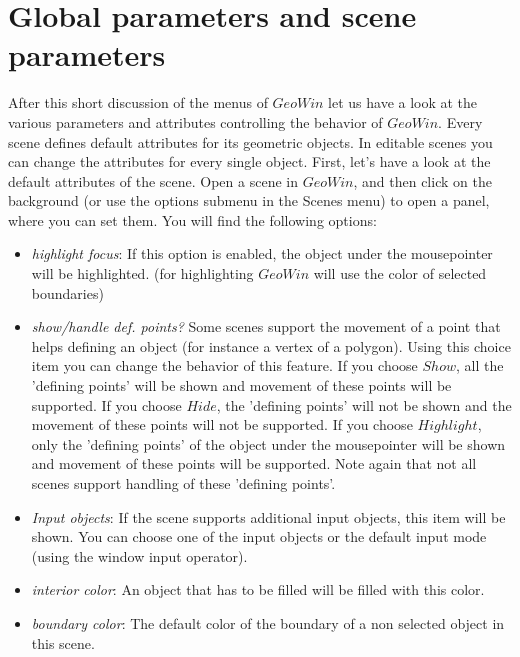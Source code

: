 \section{Global parameters and scene parameters}

After this short discussion of the menus of $GeoWin$ let us have a look at the various parameters and attributes controlling
the behavior of $GeoWin$.
Every scene defines default attributes for its geometric objects. In editable scenes you can change the
attributes for every single object.
First, let's have a look at the default attributes of the scene. Open a scene in $GeoWin$, and then click on the 
background (or use the options submenu in the Scenes menu) to open a panel, where you can set them. You will find the following
options:

\begin{itemize}

\item {\em highlight focus}: If this option is enabled, the object under the mousepointer will be highlighted.
                 (for highlighting $GeoWin$ will use the color of selected boundaries)
		 
\item {\em show/handle def. points?} Some scenes support the movement of a point that helps defining
                 an object (for instance a vertex of a polygon). Using this choice item you can change
		 the behavior of this feature. If you choose $Show$, all the 'defining points' will be
		 shown and movement of these points will be supported. If you choose $Hide$, the
		 'defining points' will not be shown and the movement of these points will not be
		 supported. If you choose $Highlight$, only the 'defining points' of the object under
		 the mousepointer will be shown and movement of these points will be supported.
		 Note again that not all scenes support handling of these 'defining points'.
		 
\item {\em Input objects}: If the scene supports additional input objects, this item will be shown.
                 You can choose one of the input objects or the default input mode (using the 
		 window input operator).
             
\item {\em interior color}: An object that has to be filled will be filled with this color.
             
\item {\em boundary color}: The default color of the boundary of a non selected object in this scene.
                 

\end{itemize}
